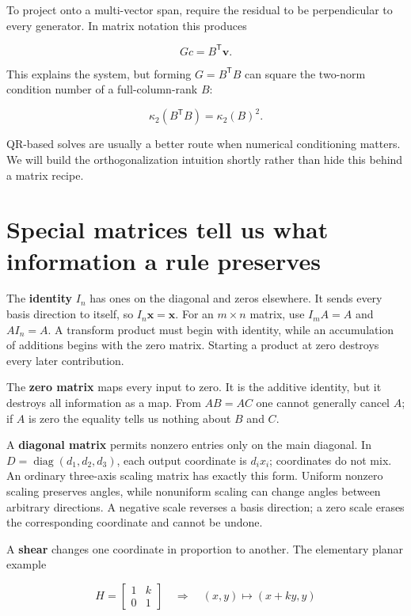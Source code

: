To project onto a multi-vector span, require the residual to be perpendicular to every generator. In matrix notation this produces

\[
Gc=B^\mathsf T\mathbf v.
\]

This explains the system, but forming \(G=B^\mathsf TB\) can square the two-norm condition number of a full-column-rank \(B\):

\[
\kappa_2(B^\mathsf TB)=\kappa_2(B)^2.
\]

QR-based solves are usually a better route when numerical conditioning matters. We will build the orthogonalization intuition shortly rather than hide this behind a matrix recipe.

\section{Special matrices tell us what information a rule preserves}\label{01-foundations-i-ch018-special-matrices-tell-us-what-information-a-rule-preserves}

The \textbf{identity} \(I_n\) has ones on the diagonal and zeros elsewhere. It sends every basis direction to itself, so \(I_n\mathbf x=\mathbf x\). For an \(m\times n\) matrix, use \(I_mA=A\) and \(AI_n=A\). A transform product must begin with identity, while an accumulation of additions begins with the zero matrix. Starting a product at zero destroys every later contribution.

The \textbf{zero matrix} maps every input to zero. It is the additive identity, but it destroys all information as a map. From \(AB=AC\) one cannot generally cancel \(A\); if \(A\) is zero the equality tells us nothing about \(B\) and \(C\).

A \textbf{diagonal matrix} permits nonzero entries only on the main diagonal. In \(D=\operatorname{diag}(d_1,d_2,d_3)\), each output coordinate is \(d_ix_i\); coordinates do not mix. An ordinary three-axis scaling matrix has exactly this form. Uniform nonzero scaling preserves angles, while nonuniform scaling can change angles between arbitrary directions. A negative scale reverses a basis direction; a zero scale erases the corresponding coordinate and cannot be undone.

A \textbf{shear} changes one coordinate in proportion to another. The elementary planar example

\[
H=\begin{bmatrix}1&k\\0&1\end{bmatrix}
\quad\Longrightarrow\quad(x,y)\mapsto(x+ky,y)
\]

